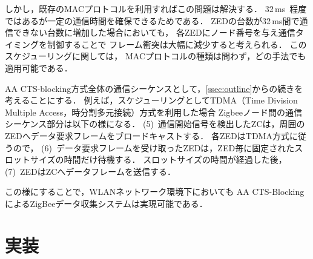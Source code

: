 \documentclass[technicalreport]{ieicej}
\begin{document}
しかし，既存のMACプロトコルを利用すればこの問題は解決する．
32\,ms~程度ではあるが一定の通信時間を確保できるためである．
ZEDの台数が32\,ms間で通信できない台数に増加した場合においても，
各ZEDにノード番号を与え通信タイミングを制御することで
フレーム衝突は大幅に減少すると考えられる．
このスケジューリングに関しては，
MACプロトコルの種類は問わず，どの手法でも適用可能である．


AA CTS-blocking方式全体の通信シーケンスとして，\ref{ssec:outline}からの続きを考えることにする．
例えば，スケジューリングとしてTDMA（Time Division Multiple Access，時分割多元接続）方式を利用した場合
Zigbeeノード間の通信シーケンス部分は以下の様になる．
(5)~通信開始信号を検出したZCは，周囲のZEDへデータ要求フレームをブロードキャストする．
各ZEDはTDMA方式に従うので，
(6)~データ要求フレームを受け取ったZEDは，ZED毎に固定されたスロットサイズの時間だけ待機する．
スロットサイズの時間が経過した後，
(7)~ZEDはZCへデータフレームを送信する．

この様にすることで，WLANネットワーク環境下においても
AA CTS-BlockingによるZigBeeデータ収集システムは実現可能である．

\section{実装}
\label{sec:imple}
\end{document}

